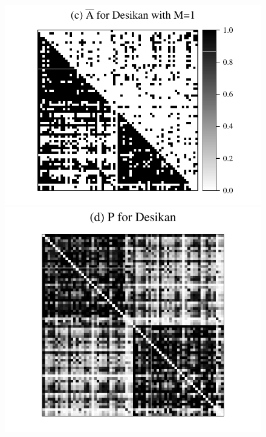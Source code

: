 \documentclass[journal,twoside,web]{ieeecolor}
\begin{document}
\begin{figure}[!tbp]
\includegraphics[height=.11005\textheight]{Abar_desikan_m1.pdf}
\includegraphics[height=.11\textheight]{P_desikan_m1.pdf} \hspace{-24pt}

\end{figure}
\end{document}

